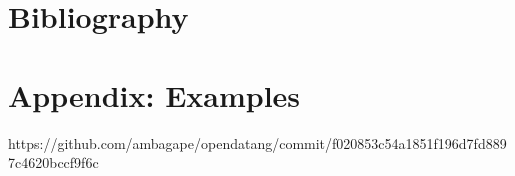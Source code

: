 \documentclass[
a4paper,
pagesize,
pdftex,
12pt,
twoside, %
BCOR=5mm, %
ngerman,
fleqn,
final,
]{scrartcl}
\begin{document}
	
	
	
	
	
	
	
	
	
	
	
	\newpage
	\section{Bibliography}
	
	
	
	
	
	
	\newpage
	\section{Appendix: Examples}


https://github.com/ambagape/opendatang/commit/f020853c54a1851f196d7fd8897c4620bccf9f6c
\end{document}
